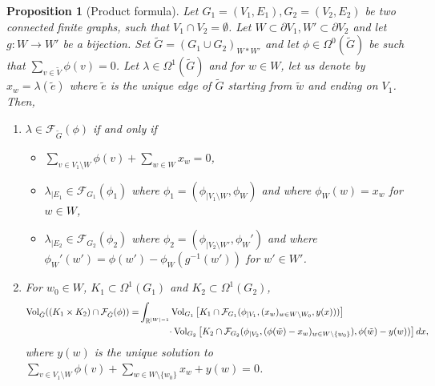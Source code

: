 \documentclass[11pt,a4paper]{amsart}
\providecommand{\Vol}{\operatorname{Vol}}
\numberwithin{equation}{section}
\newtheorem{proposition}[theorem]{Proposition}
\theoremstyle{definition}
\begin{document}
\begin{proposition}[Product formula]\label{prop:divergence_product}
Let $G_1=(V_1,E_1),G_2=(V_2,E_2)$ be two connected finite graphs, 
such that $V_1 \cap V_2 = \emptyset$. Let
$W\subset \partial V_1, W'\subset \partial V_2$ and let
$g:W\rightarrow W'$ be a bijection.
Set $\tilde{G}=(G_1\cup G_2)_{W*W'}$ and 
let $\phi\in \Omega^0(\tilde{G})$ be such that 
$\sum_{v\in \tilde{V}}\phi(v)=0$. 
Let $\lambda\in \Omega^1(\tilde{G})$ and for $w \in W$, let us 
denote by $x_w = \lambda(\tilde{e})$ where $\tilde{e}$ 
is the unique edge of $\tilde{G}$ starting from $\tilde{w}$ 
and ending on $V_1$.
Then, 
\begin{enumerate}
    \item $\lambda\in\mathcal{F}_{\tilde{G}}(\phi)$ if and only if 
\begin{itemize}
    \item[(a)] $\sum_{v\in V_1\setminus W}\phi(v)+\sum_{w\in W} x_w=0$,
    \item[(b)] $\lambda_{\vert E_1}\in 
    \mathcal{F}_{G_1}(\phi_1)$ where 
    $\phi_1 = \left( \phi_{\vert V_1 \setminus W}, 
    \phi_W \right)$ and where $\phi_W(w) = x_w$ for $w \in W$,
    \item[(c)] $\lambda_{\vert E_2}\in 
    \mathcal{F}_{G_2}(\phi_2)$ where $\phi_2 = \left( \phi_{\vert V_2\setminus W'}, 
    \phi_W' \right)$ and where $\phi_W'(w') = \phi(w') - \phi_W(g^{-1}(w'))$ for $w' \in W'$.
\end{itemize} 
\item For $w_0\in W$, $K_1 \subset \Omega^1(G_1) $ and $
K_2\subset \Omega^{1}(G_2)$,
\begin{align*}
\Vol_{\tilde{G}}((K_1\times K_2)\cap\mathcal{F}_{\tilde{G}}(\phi)) = 
&\int_{\mathbb{R}^{\vert W\vert-1}}\Vol_{G_1}\left[K_1\cap \mathcal{F}_{G_1}(\phi_{\vert V_1},(x_w)_{w\in W\setminus W_0},y(x)))\right]\\
&\hspace{1.1cm}\cdot \Vol_{G_2}\left[K_2\cap \mathcal{F}_{G_2}(\phi_{\vert V_2},(\phi(\tilde{w})-x_w)_{w\in W\setminus \{w_0\}}),\phi(\tilde{w})-y(w))\right]dx,
\end{align*}
where $y(w)$ is the unique solution to 
$\sum_{v\in V_1\setminus W} \phi(v) + 
\sum_{w\in W\setminus \{w_0\}}x_w+y(w)=0$.
\end{enumerate}

\end{proposition}
\end{document}

